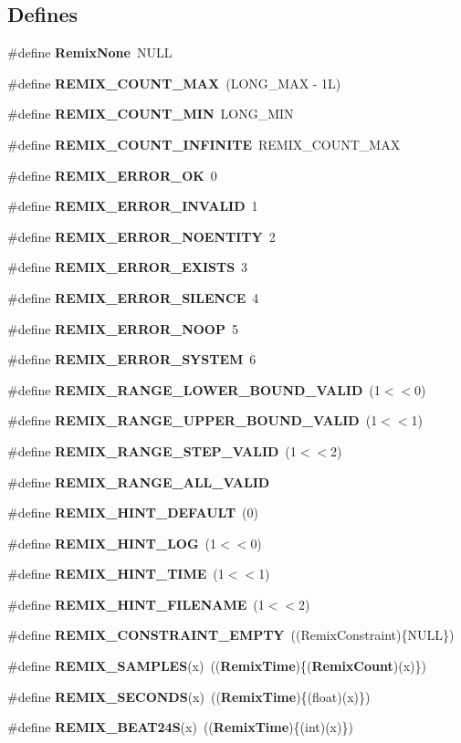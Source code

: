 \subsection*{Defines}
\begin{CompactItemize}
\item 
\#define {\bf Remix\-None}\ NULL
\item 
\#define {\bf REMIX\_\-COUNT\_\-MAX}\ (LONG\_\-MAX - 1L)
\item 
\#define {\bf REMIX\_\-COUNT\_\-MIN}\ LONG\_\-MIN
\item 
\#define {\bf REMIX\_\-COUNT\_\-INFINITE}\ REMIX\_\-COUNT\_\-MAX
\item 
\#define {\bf REMIX\_\-ERROR\_\-OK}\ 0
\item 
\#define {\bf REMIX\_\-ERROR\_\-INVALID}\ 1
\item 
\#define {\bf REMIX\_\-ERROR\_\-NOENTITY}\ 2
\item 
\#define {\bf REMIX\_\-ERROR\_\-EXISTS}\ 3
\item 
\#define {\bf REMIX\_\-ERROR\_\-SILENCE}\ 4
\item 
\#define {\bf REMIX\_\-ERROR\_\-NOOP}\ 5
\item 
\#define {\bf REMIX\_\-ERROR\_\-SYSTEM}\ 6
\item 
\#define {\bf REMIX\_\-RANGE\_\-LOWER\_\-BOUND\_\-VALID}\ (1$<$$<$0)
\item 
\#define {\bf REMIX\_\-RANGE\_\-UPPER\_\-BOUND\_\-VALID}\ (1$<$$<$1)
\item 
\#define {\bf REMIX\_\-RANGE\_\-STEP\_\-VALID}\ (1$<$$<$2)
\item 
\#define {\bf REMIX\_\-RANGE\_\-ALL\_\-VALID}
\item 
\#define {\bf REMIX\_\-HINT\_\-DEFAULT}\ (0)
\item 
\#define {\bf REMIX\_\-HINT\_\-LOG}\ (1$<$$<$0)
\item 
\#define {\bf REMIX\_\-HINT\_\-TIME}\ (1$<$$<$1)
\item 
\#define {\bf REMIX\_\-HINT\_\-FILENAME}\ (1$<$$<$2)
\item 
\#define {\bf REMIX\_\-CONSTRAINT\_\-EMPTY}\ ((Remix\-Constraint)\{NULL\})
\item 
\#define {\bf REMIX\_\-SAMPLES}(x)\ (({\bf Remix\-Time})\{({\bf Remix\-Count})(x)\})
\item 
\#define {\bf REMIX\_\-SECONDS}(x)\ (({\bf Remix\-Time})\{(float)(x)\})
\item 
\#define {\bf REMIX\_\-BEAT24S}(x)\ (({\bf Remix\-Time})\{(int)(x)\})
\end{CompactItemize}
